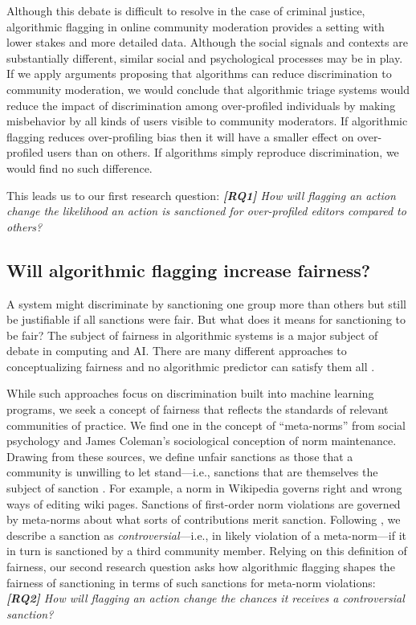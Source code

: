 \documentclass[format=acmsmall, natbib=true,  screen=true]{acmart}
\begin{document}
Although this debate is difficult to resolve in the case of criminal justice, algorithmic flagging in online community moderation provides a setting with lower stakes and more detailed data. Although the social signals and contexts are substantially different, similar social and psychological processes may be in play.
If we apply arguments proposing that algorithms can reduce discrimination to community moderation, we would conclude that algorithmic triage systems would reduce the impact of discrimination among over-profiled individuals by making misbehavior by all kinds of users visible to community moderators. If algorithmic flagging reduces over-profiling bias then it will have a smaller effect on over-profiled users than on others. If algorithms simply reproduce discrimination, we would find no such difference. 

This leads us to our first research question: 
\textit{\textbf{[RQ1]}  How will flagging an action change the likelihood an action is sanctioned for over-profiled editors compared to others?}

\subsection{Will algorithmic flagging increase fairness?}


A system might discriminate by sanctioning one group more than others but still be justifiable if all sanctions were fair.
But what does it means for sanctioning to be fair? The subject of fairness in algorithmic systems is a major subject of debate in computing and AI. There are many different approaches to conceptualizing fairness and no algorithmic predictor can satisfy them all \citep{barocas_fairness_2019,caraban_23_2019,kleinberg_inherent_2016,  mitchell_prediction-based_2018,yin_understanding_2019,wallach_big_2019}. 

While such approaches focus on discrimination built into machine learning programs, we seek a concept of fairness that reflects the standards of relevant communities of practice.  We find one in the concept of ``meta-norms'' from social psychology and James Coleman's sociological conception of norm maintenance. Drawing from these sources, we define unfair sanctions as those that a community is unwilling to let stand---i.e., sanctions that are themselves the subject of sanction \citep{coleman_social_1988, horne_enforcement_2001, piskorski_testing_2017}. 
For example, a norm in Wikipedia governs right and wrong ways of editing wiki pages. Sanctions of first-order norm violations are governed by meta-norms about what sorts of contributions merit sanction. Following \citet{piskorski_testing_2017}, we describe a sanction as \emph{controversial}---i.e., in likely violation of a meta-norm---if it in turn is sanctioned by a third community member.
Relying on this definition of fairness, our second research question asks how algorithmic flagging shapes the fairness of sanctioning in terms of such sanctions for meta-norm violations: \textit{\textbf{[RQ2]} How will flagging an action change the chances it receives a controversial sanction?}
\end{document}

